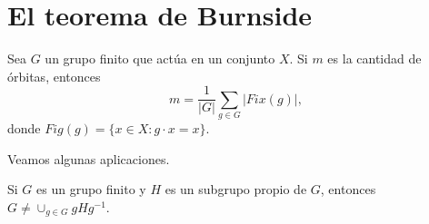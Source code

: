 \chapter{El teorema de Burnside}

\begin{theorem}[Burnside]
Sea $G$ un grupo finito que actúa en un conjunto $X$. Si $m$ es la cantidad de órbitas, entonces
\[
m=\frac{1}{|G|}\sum_{g\in G}|Fix(g)|,
\]
donde $Fig(g)=\{x\in X:g\cdot x=x\}$. 	
\end{theorem}

Veamos algunas aplicaciones.

\begin{theorem}[Jordan]
	
\end{theorem}

\begin{corollary}
	Si $G$ es un grupo finito y $H$ es un subgrupo propio de $G$, entonces $G\ne\cup_{g\in G}gHg^{-1}$.
\end{corollary}

